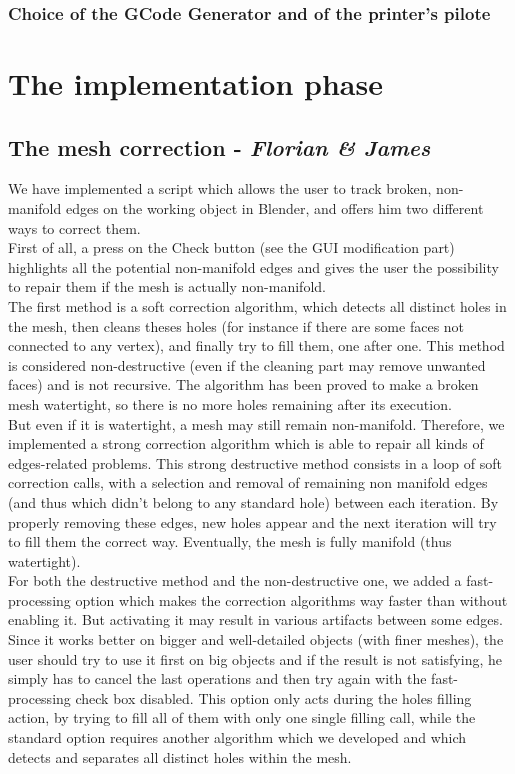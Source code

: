 \documentclass{report}
\begin{document}
\subsection{Choice of the GCode Generator and of the printer's pilote}

\chapter{The implementation phase}

\section{The mesh correction - \textit{Florian \& James}}

We have implemented a script which allows the user to track broken, non-manifold edges on the working object in Blender, and offers him two different ways to correct them.\\

First of all, a press on the Check button (see the GUI modification part) highlights all the potential non-manifold edges and gives the user the possibility to repair them if the mesh is actually non-manifold.\\

The first method is a soft correction algorithm, which detects all distinct holes in the mesh, then cleans theses holes (for instance if there are some faces not connected to any vertex), and finally try to fill them, one after one. This method is considered non-destructive (even if the cleaning part may remove unwanted faces) and is not recursive. The algorithm has been proved to make a broken mesh watertight, so there is no more holes remaining after its execution.\\

But even if it is watertight, a mesh may still remain non-manifold. Therefore, we implemented a strong correction algorithm which is able to repair all kinds of edges-related problems. This strong destructive method consists in a loop of soft correction calls, with a selection and removal of remaining non manifold edges (and thus which didn't belong to any standard hole) between each iteration. By properly removing these edges, new holes appear and the next iteration will try to fill them the correct way. Eventually, the mesh is fully manifold (thus watertight).\\

For both the destructive method and the non-destructive one, we added a fast-processing option which makes the correction algorithms way faster than without enabling it. But activating it may result in various artifacts between some edges. Since it works better on bigger and well-detailed objects (with finer meshes), the user should try to use it first on big objects and if the result is not satisfying, he simply has to cancel the last operations and then try again with the fast-processing check box disabled. This option only acts during the holes filling action, by trying to fill all of them with only one single filling call, while the standard option requires another algorithm which we developed and which detects and separates all distinct holes within the mesh.
\end{document}
